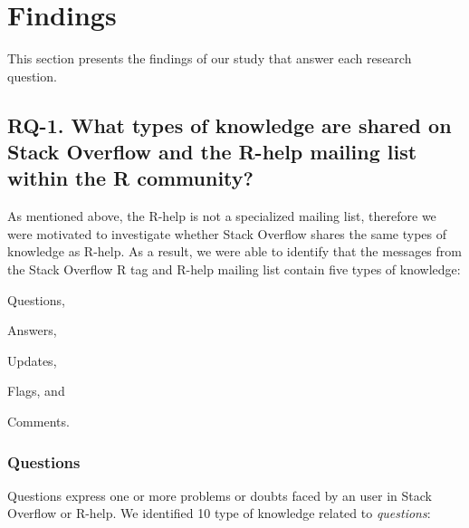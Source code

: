 \section{Findings}
\label{cha:findings}

This section presents the findings of our study that answer each research question.

\subsection{RQ-1. What types of knowledge are shared on Stack Overflow and the R-help mailing list within the R community?}
\label{cha:findings-types}

    As mentioned above, the R-help is not a specialized mailing list, therefore we were motivated to investigate whether Stack Overflow shares the same types of knowledge as R-help.
    As a result, we were able to identify that the messages from the Stack Overflow R tag and R-help mailing list contain five types of knowledge:
    \begin{enumerate*}[label=(\arabic*)]
        \item Questions,
        \item Answers,
        \item Updates,
        \item Flags, and
        \item Comments.
    \end{enumerate*}

\subsubsection{Questions}

Questions express one or more problems or doubts faced by an user in Stack Overflow or R-help.
We identified 10 type of knowledge related to \emph{questions}:

